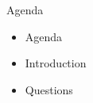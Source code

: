 \begin{frame}{Agenda}
	\begin{itemize}
		\item Agenda
		\item Introduction
		\item Questions
	\end{itemize}
\end{frame}
